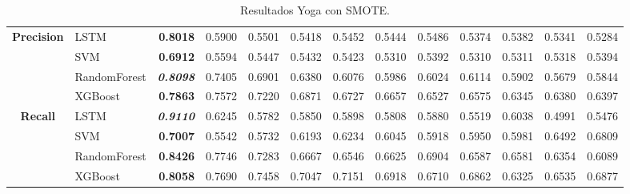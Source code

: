 \begin{table}[H]
\begin{adjustbox}{max width=12cm}
\begin{tabular}{|c|l|r|r|r|r|r|r|r|r|r|r|r|}
			\hline
			\textbf{Precision} &  LSTM & \textbf{  0.8018 } &  0.5900 &  0.5501 &  0.5418 &  0.5452 &  0.5444 &  0.5486 &  0.5374 &  0.5382 &  0.5341 &  0.5284 \\
			&  SVM & \textbf{  0.6912 } &  0.5594 &  0.5447 &  0.5432 &  0.5423 &  0.5310 &  0.5392 &  0.5310 &  0.5311 &  0.5318 &  0.5394 \\
			&  RandomForest & \textit{ \textbf{  0.8098 } } &  0.7405 &  0.6901 &  0.6380 &  0.6076 &  0.5986 &  0.6024 &  0.6114 &  0.5902 &  0.5679 &  0.5844 \\
			&  XGBoost & \textbf{  0.7863 } &  0.7572 &  0.7220 &  0.6871 &  0.6727 &  0.6657 &  0.6527 &  0.6575 &  0.6345 &  0.6380 &  0.6397 \\
			\hline
			\textbf{Recall} &  LSTM & \textit{ \textbf{  0.9110 } } &  0.6245 &  0.5782 &  0.5850 &  0.5898 &  0.5808 &  0.5880 &  0.5519 &  0.6038 &  0.4991 &  0.5476 \\
			&  SVM & \textbf{  0.7007 } &  0.5542 &  0.5732 &  0.6193 &  0.6234 &  0.6045 &  0.5918 &  0.5950 &  0.5981 &  0.6492 &  0.6809 \\
			&  RandomForest & \textbf{  0.8426 } &  0.7746 &  0.7283 &  0.6667 &  0.6546 &  0.6625 &  0.6904 &  0.6587 &  0.6581 &  0.6354 &  0.6089 \\
			&  XGBoost & \textbf{  0.8058 } &  0.7690 &  0.7458 &  0.7047 &  0.7151 &  0.6918 &  0.6710 &  0.6862 &  0.6325 &  0.6535 &  0.6877 \\
			\hline
		\end{tabular}
	\end{adjustbox}
	\caption{Resultados Yoga con SMOTE.}
	\label{tab:Yoga_SMOTE}
\end{table}
